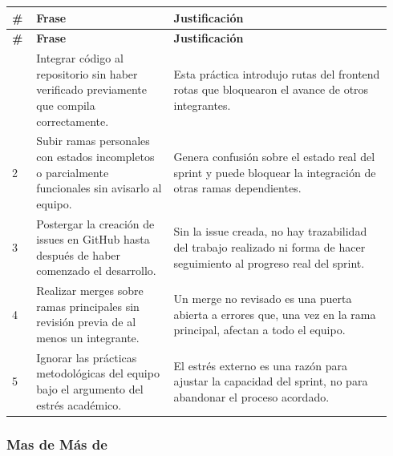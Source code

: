 \documentclass[11pt,a4paper]{article}
\begin{document}
\begingroup
\scriptsize
\setlength{\tabcolsep}{3pt}
\begin{longtable}{P{0.06\linewidth}P{0.34\linewidth}P{0.54\linewidth}}
\toprule
\textbf{\#} & \textbf{Frase} & \textbf{Justificación} \\
\midrule
\endfirsthead
\toprule
\textbf{\#} & \textbf{Frase} & \textbf{Justificación} \\
\midrule
\endhead
\bottomrule
{} & Integrar código al repositorio sin haber verificado previamente que compila correctamente. & Esta práctica introdujo rutas del frontend rotas que bloquearon el avance de otros integrantes. \\
2 & Subir ramas personales con estados incompletos o parcialmente funcionales sin avisarlo al equipo. & Genera confusión sobre el estado real del sprint y puede bloquear la integración de otras ramas dependientes. \\
3 & Postergar la creación de issues en GitHub hasta después de haber comenzado el desarrollo. & Sin la issue creada, no hay trazabilidad del trabajo realizado ni forma de hacer seguimiento al progreso real del sprint. \\
4 & Realizar merges sobre ramas principales sin revisión previa de al menos un integrante. & Un merge no revisado es una puerta abierta a errores que, una vez en la rama principal, afectan a todo el equipo. \\
5 & Ignorar las prácticas metodológicas del equipo bajo el argumento del estrés académico. & El estrés externo es una razón para ajustar la capacidad del sprint, no para abandonar el proceso acordado. \\
\end{longtable}
\endgroup

\subsubsection{Mas de Más de}
\end{document}
